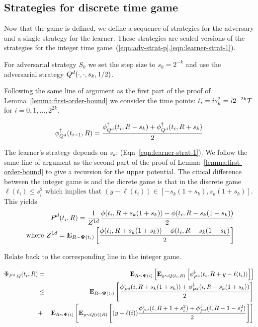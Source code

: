 \documentclass{article}[12pt]
\begin{document}
\subsection{Strategies for discrete time game}
Now that the game is defined, we define a sequence of strategies for
the adversary and a single strategy for the learner. These strategies
are scaled versions of the strategies for the integer time
game~(\ref{eqn:adv-strat-p},\ref{eqn:learner-strat-1}).

For adversarial strategy $S_k$ we set the step size to
$s_k=2^{-k}$ and use the adversarial strategy
$Q^d(\cdot,\cdot,s_k,1/2)$.

Following the same line of argument as the first part of the proof of
Lemma~\ref{lemma:first-order-bound} we consider the time points:
$t_i=i s_k^2=i 2^{-2k}\mathcal{T}$ for $i=0,1,\ldots,2^{2k}$.

  \begin{equation} \label{eqn:lower-discrete}
    \phi_{Q^d}^{\uparrow}(t_{i-1},R) = \frac{\phi_{Q^d}^{\uparrow}(t_i,R-s_k)+\phi_{Q^d}^{\uparrow}(t_i,R+s_k)}{2}
  \end{equation}

The learner's strategy depends on $s_k$:
(Eqn~\ref{eqn:learner-strat-1}). We follow the same line of argument as the second part of the proof of
Lemma~\ref{lemma:first-order-bound} to give a recursion for the upper
potential. The citical difference between the integer game is and the
dicrete game is that in the discrete game $\ell(t_i)\leq s_i^2$ which
implies that $(y-\ell(t_i)) \in [-s_k(1+s_k),s_k(1+s_k)]$. This yields 
\begin{eqnarray} \label{eqn:learner-strat-1c}
  P^{d}(t_{i},R) = \frac{1}{Z^{1d}}
  \frac{\phi(t_i,R+s_k(1+s_k)) -
  \phi(t_i,R-s_k(1+s_k))}{2} \\
  \mbox{ where } Z^{1d} = {\bf E}_{R \sim {\bf \Psi}(t_i)}\left[ \frac{\phi(t_i,R+s_k(1+s_k)) -
  \phi(t_i,R-s_k(1+s_k)}{2} \right] \nonumber
\end{eqnarray}

Relate back to the corresponding line in the integer game.

  \begin{eqnarray}
  \Phi_{P^d,Q}(t_i,R)&=&{\bf E}_{R \sim {\bf \Psi}(i)}\left[ {\bf E}_{y \sim Q(t_i,R)}\left[ \phi_{P^d}^{\downarrow}(t_i,R+y-\ell(t_i)) \right] \right]\\
  &\leq & {\bf E}_{R \sim {\bf \Psi}(t_i)}\left[ \frac{\phi_{P^d}^{\downarrow}(i,R+s_k(1+s_k))+\phi_{P^d}^{\downarrow}(i,R-s_k(1+s_k))}{2} \right]\\
  &+&
      {\bf E}_{R \sim {\bf \Psi}(i)}\left[ {\bf E}_{y \sim Q(i)(R)}\left[ (y-\ell(i))
      \frac{\phi_{P^d}^{\downarrow}(i,R+1+s_i^2)+\phi_{P^d}^{\downarrow}(i,R-1-s_i^2)}{2} \right] \right]
  \end{eqnarray}
\end{document}
